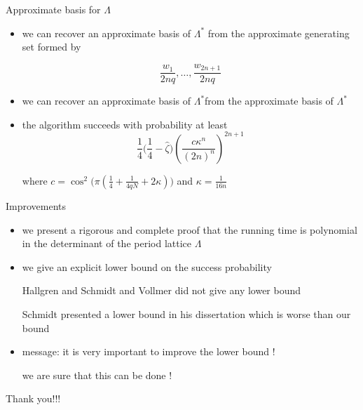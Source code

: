 \documentclass[slideColor]{prosper}
\renewcommand{\>}{\rangle}
\newcommand{\<}{\langle}
\begin{document}

\begin{slide}{Approximate basis for $\Lambda$}

\begin{itemize}

\item we can recover an approximate basis of $\Lambda^*$ from the approximate generating set formed by 

\[
	\frac{w_1}{2nq},\ldots,\frac{w_{2n+1}}{2nq}
\]  

\medskip
\item we can recover an approximate basis of $\Lambda^*$from the approximate basis of $\Lambda^*$

\medskip
\item the algorithm succeeds with probability at least
\[
	\frac{1}{4} \Big( \frac{1}{4}-\hat{\zeta} \Big) \left( \frac{c \kappa^n}{(2n)^n} \right)^{2n+1}
\]

where $c=\cos^2\big( \pi ( \tfrac{1}{4} + \tfrac{1}{4qN} + 2\kappa) \big)$ and $\kappa = \tfrac{1}{16n}$
\end{itemize}

\end{slide}


\begin{slide}{Improvements}

\begin{itemize}

\item we present a rigorous and complete proof that the running time is polynomial in the determinant of the period lattice $\Lambda$

\medskip
\item we give an explicit lower bound on the success probability 

\medskip
{\sc Hallgren} and {\sc Schmidt and Vollmer} did not give any lower bound

\medskip
{\sc Schmidt} presented a lower bound in his dissertation which is worse than our bound  

\medskip
\item message: it is very important to improve the lower bound ! 

\medskip
we are sure that this can be done !

\end{itemize}

\end{slide}

\begin{slide}{Thank you!!!}

\end{slide}
\end{document}
